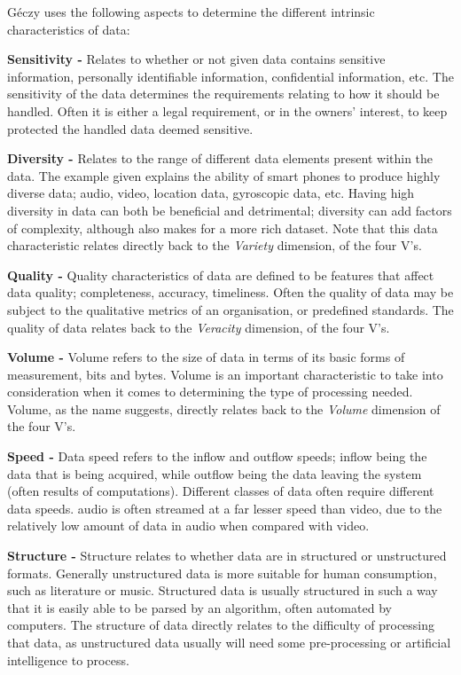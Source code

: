 \noindent G\'eczy uses the following aspects to determine the different intrinsic characteristics of data:

\noindent \textbf{Sensitivity -} Relates to whether or not given data contains sensitive information, \ie{}personally
identifiable information, confidential information, etc. The sensitivity of the data determines the requirements relating
to how it should be handled. Often it is either a legal requirement, or in the owners' interest, to keep protected the
handled data deemed sensitive.

\noindent \textbf{Diversity -} Relates to the range of different data elements present within the data. The example given
explains the ability of smart phones to produce highly diverse data; \eg{}audio, video, location data, gyroscopic data,
etc. Having high diversity in data can both be beneficial and detrimental; diversity can add factors of complexity,
although also makes for a more rich dataset. Note that this data characteristic relates directly back to the
\emph{Variety} dimension, of the four V's.

\noindent \textbf{Quality -} Quality characteristics of data are defined to be features that affect data quality;
\eg{}completeness, accuracy, timeliness. Often the quality of data may be subject to the qualitative metrics of an
organisation, or predefined standards. The quality of data relates back to the \emph{Veracity} dimension, of the four
V's.

\noindent \textbf{Volume -} Volume refers to the size of data in terms of its basic forms of measurement, bits and bytes.
Volume is an important characteristic to take into consideration when it comes to determining the type of processing
needed. Volume, as the name suggests, directly relates back to the \emph{Volume} dimension of the four V's.

\noindent \textbf{Speed -} Data speed refers to the inflow and outflow speeds; inflow being the data that is being
acquired, while outflow being the data leaving the system (often results of computations). Different classes of data
often require different data speeds. \eg{}audio is often streamed at a far lesser speed than video, due to the
relatively low amount of data in audio when compared with video.

\noindent \textbf{Structure -} Structure relates to whether data are in structured or unstructured formats. Generally
unstructured data is more suitable for human consumption, such as literature or music. Structured data is usually
structured in such a way that it is easily able to be parsed by an algorithm, often automated by computers. The
structure of data directly relates to the difficulty of processing that data, as unstructured data usually will need
some pre-processing or artificial intelligence to process.

